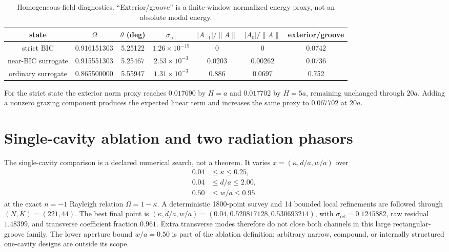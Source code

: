 \documentclass[aps,prl,reprint,superscriptaddress,nofootinbib,floatfix]{revtex4-2}
\begin{document}
\begin{table}[t]
\caption{\label{tab:s-fields}Homogeneous-field diagnostics.  ``Exterior/groove''
is a finite-window normalized energy proxy, not an absolute modal energy.}
\begin{ruledtabular}
\begin{tabular}{ccccccc}
state & $\Omega$ & $\theta$ (deg) & $\sigma_{\mathrm{rel}}$ &
$|A_{-1}|/\|A\|$ & $|A_0|/\|A\|$ & exterior/groove\\
\hline
strict BIC & 0.916151303 & 5.25122 & $1.26\times10^{-15}$ & 0 & 0 & 0.0742\\
near-BIC surrogate & 0.915551303 & 5.25467 & $2.53\times10^{-3}$ & 0.0203 & 0.00262 & 0.0736\\
ordinary surrogate & 0.865500000 & 5.55947 & $1.31\times10^{-3}$ & 0.886 & 0.0697 & 0.752\\
\end{tabular}
\end{ruledtabular}
\end{table}

For the strict state the exterior norm proxy reaches $0.017690$ by $H=a$ and
$0.017702$ by $H=5a$, remaining unchanged through $20a$.  Adding a nonzero
grazing component produces the expected linear term and increases the same
proxy to $0.067702$ at $20a$.

\section{Single-cavity ablation and two radiation phasors}

The single-cavity comparison is a declared numerical search, not a theorem.
It varies $x=(\kappa,d/a,w/a)$ over
\begin{align}
 0.04&\leq\kappa\leq0.25,\nonumber\\
 0.04&\leq d/a\leq2.00,\nonumber\\
 0.50&\leq w/a\leq0.95.                                              \label{eq:s-single-bounds}
\end{align}
at the exact $n=-1$ Rayleigh relation $\Omega=1-\kappa$.  A deterministic
1800-point survey and 14 bounded local refinements are followed through
$(N,K)=(221,44)$.  The best final point is
$(\kappa,d/a,w/a)=(0.04,0.520817128,0.530693214)$, with
$\sigma_{\mathrm{rel}}=0.1245882$, raw residual $1.48399$, and transverse
coefficient fraction $0.961$.  Extra transverse modes therefore do not close
both channels in this large rectangular-groove family.  The lower aperture
bound $w/a=0.50$ is part of the ablation definition; arbitrary narrow,
compound, or internally structured one-cavity designs are outside its scope.
\end{document}
